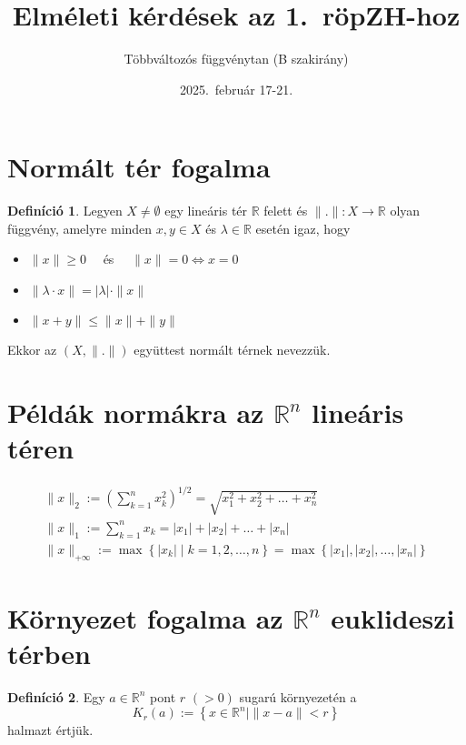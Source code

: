 \documentclass{article}
\title{Elméleti kérdések az 1.\ röpZH-hoz}
\author{Többváltozós függvénytan (B szakirány)}
\date{2025.\ február 17-21.}
\theoremstyle{definition}
\newtheorem*{definition*}{Definíció}
\begin{document}
\maketitle
\tableofcontents
\goodbreak
\section{Normált tér fogalma}
\begin{definition*}
	Legyen $X \neq \emptyset$ egy lineáris tér $\mathbb{R}$ felett és
	$\| . \|: X \to \mathbb{R}$ olyan függvény,
	amelyre minden $x, y \in X$ és $\lambda \in \mathbb{R}$ esetén igaz, hogy
	\begin{itemize}
		\item $\| x \| \geq 0 \quad$ és $\quad \| x \| = 0 \iff x = 0$
		\item $\| \lambda \cdot x \| = |\lambda| \cdot \| x \|$
		\item $\| x + y \| \leq \| x \| + \| y \|$
	\end{itemize}
	Ekkor az $(X, \| . \|)$ együttest normált térnek nevezzük.
\end{definition*}
\goodbreak
\section{Példák normákra az $\mathbb{R}^n$ lineáris téren}
\begin{gather*}
	\| x \|_2 := \left( \sum_{k = 1}^n x_k^2 \right)^{1 / 2} =
	\sqrt{x_1^2 + x_2^2 + \dots + x_n^2} \\
	\| x \|_1 := \sum_{k = 1}^n x_k = |x_1| + |x_2| + \dots + |x_n| \\
	\| x \|_{+\infty} := \max\left\{ |x_k| \mid k = 1, 2, \dots, n \right\} =
	\max\left\{ |x_1|, |x_2|, \dots, |x_n|  \right\}
\end{gather*}
\goodbreak
\section{Környezet fogalma az $\mathbb{R}^n$ euklideszi térben}
\begin{definition*}
	Egy $a \in \mathbb{R}^n$ pont $r$ $(> 0)$ sugarú környezetén a
	\begin{equation*}
		K_r(a) := \left\{ x \in \mathbb{R}^n \mid \| x - a \| < r \right\}
	\end{equation*}
	halmazt értjük.
\end{definition*}
\end{document}
